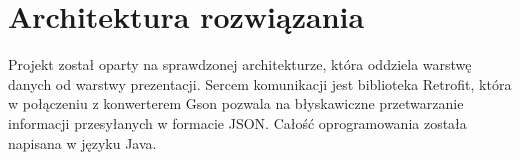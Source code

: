 \section{Architektura rozwiązania}
Projekt został oparty na sprawdzonej architekturze, która oddziela warstwę danych od warstwy prezentacji. Sercem komunikacji jest biblioteka Retrofit, która w połączeniu z konwerterem Gson pozwala na błyskawiczne przetwarzanie informacji przesyłanych w formacie JSON. Całość oprogramowania została napisana w języku Java.